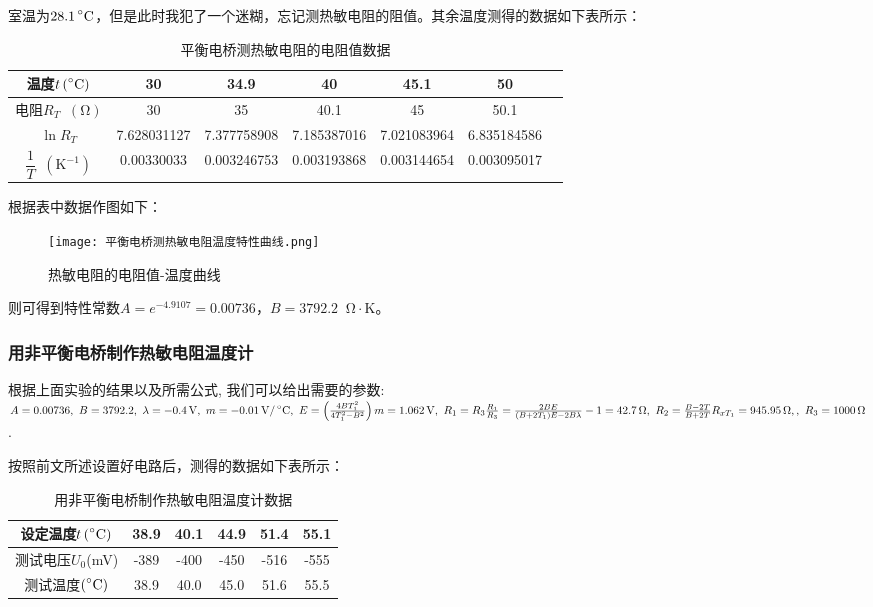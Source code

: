 \documentclass[11pt]{article}
\newcommand*{\unit}[1]{\mathop{}\!\mathrm{#1}}
\newcommand*{\mcelsius}{\unit{\prescript{\circ}{}C}}
\begin{document}
室温为$28.1\mcelsius$，但是此时我犯了一个迷糊，忘记测热敏电阻的阻值。其余温度测得的数据如下表所示：

\begin{table}[H]
  \centering
  \caption{平衡电桥测热敏电阻的电阻值数据}
  \begin{tabular}{|c|c|c|c|c|c|c|}
      \hline
      温度$t \unit{(\mcelsius)}$&30&34.9&40&45.1&50\\
      \hline
      电阻$R_T \unit{(\Omega)}$&30    & 35    & 40.1  & 45    & 50.1 \\
      \hline
      $\ln R_T$&7.628031127 & 7.377758908 & 7.185387016 & 7.021083964 & 6.835184586 \\
      \hline
      $\dfrac{1}{T} \unit{(K^{-1})}$&0.00330033 & 0.003246753 & 0.003193868 & 0.003144654 & 0.003095017 \\
      \hline
  \end{tabular}
\end{table}

根据表中数据作图如下：

\begin{figure}[H]
    \centering
    \texttt{[image: 平衡电桥测热敏电阻温度特性曲线.png]}
    \caption{热敏电阻的电阻值-温度曲线}
\end{figure}

则可得到特性常数$A=e^{-4.9107}=0.00736$，$B=3792.2 \unit{\Omega \cdot K}$。

\subsubsection{用非平衡电桥制作热敏电阻温度计}

根据上面实验的结果以及所需公式, 我们可以给出需要的参数:
$A = 0.00736,\ B = 3792.2,\ \lambda = -0.4\unit{V},\ m = -0.01\unit{V/\mcelsius},\ E =\left(\frac{4BT_1^2}{4T_1^2-B^2}\right)m = 1.062\unit{V},\ R_1 = R_3 \frac{R_1}{R_3}=\frac{2BE}{(B+2T_1)E-2B\lambda}-1 = 42.7\unit{\Omega},\ R_2 = \frac{B-2T}{B+2T}R_{xT_1} = 945.95\unit{\Omega},,\ R_3 = 1000\unit{\Omega}$.

按照前文所述设置好电路后，测得的数据如下表所示：

\begin{table}[H]
  \centering
  \caption{用非平衡电桥制作热敏电阻温度计数据}
  \begin{tabular}{|c|c|c|c|c|c|}
      \hline
      设定温度$t \unit{(\mcelsius)}$&38.9  & 40.1  & 44.9  & 51.4  & 55.1 \\
      \hline
      测试电压$U_0$(mV)&-389  & -400  & -450  & -516  & -555 \\
      \hline
      测试温度$\unit{(\mcelsius)}$&38.9  & 40.0  & 45.0  & 51.6  & 55.5  \\
      \hline
  \end{tabular}
\end{table}
\end{document}
